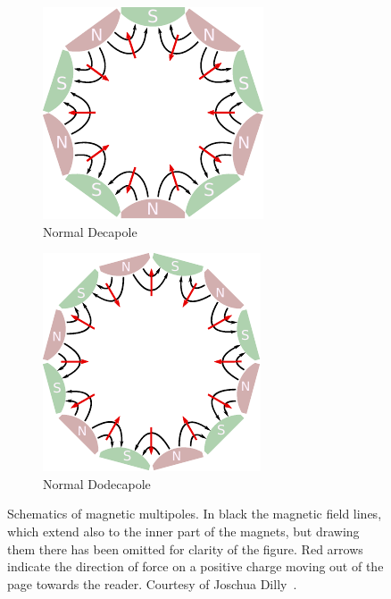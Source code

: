\begin{figure}[!htb]
\begin{subfigure}{0.243\textwidth}
        \includegraphics[height=\magnetheight]{images/magnets/decapole_normal.pdf}
        \caption{
           Normal Decapole 
        }
        \label{fig:MDNorm}
    \end{subfigure}
    \begin{subfigure}{0.243\textwidth}
        \includegraphics[height=\magnetheight]{images/magnets/dodecapole_normal.pdf}
        \caption{
           Normal Dodecapole 
        }
        \label{fig:MTNorm}
    \end{subfigure}
    \caption{
        Schematics of magnetic multipoles. In black the magnetic field lines,
        which extend also to the inner part of the magnets, 
        but drawing them there has been omitted for clarity of the figure.
        Red arrows indicate the direction of force on a 
        positive charge moving out of the page towards the reader.
        Courtesy of Joschua Dilly~\cite{dilly_corrections_2022}.
    }
    \label{fig:background:magnetic_fields:schematics}
\end{figure}



